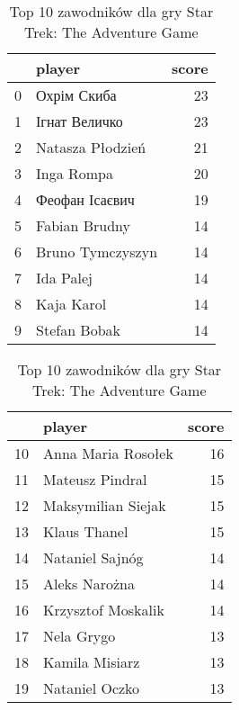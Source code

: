 
\begin{table}[h]
\begin{minipage}{.5\linewidth}
\caption{Top 10 zawodników dla gry Wings of War: Watch Your Back!}\label{tab:top10_1}
\centering
\begin{tabular}{rlr}
\hline
    & player           &   score \\
\hline
  0 & Охрім Скиба      &      23 \\
  1 & Ігнат Величко    &      23 \\
  2 & Natasza Płodzień &      21 \\
  3 & Inga Rompa       &      20 \\
  4 & Феофан Ісаєвич   &      19 \\
  5 & Fabian Brudny    &      14 \\
  6 & Bruno Tymczyszyn &      14 \\
  7 & Ida Palej        &      14 \\
  8 & Kaja Karol       &      14 \\
  9 & Stefan Bobak     &      14 \\
\hline
\end{tabular}
\end{minipage}%
\begin{minipage}{.5\linewidth}
\centering
\caption{Top 10 zawodników dla gry Star Trek: The Adventure Game}\label{tab:top10_2}
\begin{tabular}{rlr}
\hline
    & player             &   score \\
\hline
 10 & Anna Maria Rosołek &      16 \\
 11 & Mateusz Pindral    &      15 \\
 12 & Maksymilian Siejak &      15 \\
 13 & Klaus Thanel       &      15 \\
 14 & Nataniel Sajnóg    &      14 \\
 15 & Aleks Narożna      &      14 \\
 16 & Krzysztof Moskalik &      14 \\
 17 & Nela Grygo         &      13 \\
 18 & Kamila Misiarz     &      13 \\
 19 & Nataniel Oczko     &      13 \\
\hline
\end{tabular}
\end{minipage}%
\end{table}
